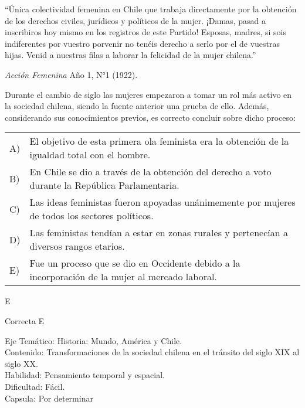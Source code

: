\documentclass[letterpaper,11pt]{article}
\newcommand{\anchopregunta}{0.9\textwidth}
\begin{document}
\begin{enumerate}
\begin{minipage}{\anchopregunta}
\item ``Única colectividad femenina en Chile que trabaja directamente por la obtención de los derechos civiles, jurídicos y políticos de la mujer. ¡Damas, pasad a inscribiros hoy mismo en los registros de este Partido! Esposas, madres, si sois indiferentes por vuestro porvenir no tenéis derecho a serlo por el de vuestras hijas. Venid a nuestras filas a laborar la felicidad de la mujer chilena.''
\begin{flushright}
\textit{Acción Femenina} Año 1, N°1 (1922).
\end{flushright}
Durante el cambio de siglo las mujeres empezaron a tomar un rol más activo en la sociedad chilena, siendo la fuente anterior una prueba de ello. Además, considerando sus conocimientos previos, es correcto concluir sobre dicho proceso:
\begin{flushleft}\begin{tabular}{@{\hspace{-.001\textwidth}}l@{\hspace{2pt}}p{}}
A)& El objetivo de esta primera ola feminista era la obtención de la igualdad total con el hombre.\\
B)& En Chile se dio a través de la obtención del derecho a voto durante la República Parlamentaria.\\
C)& Las ideas feministas fueron apoyadas unánimemente por mujeres de todos los sectores políticos.\\
D)& Las feministas tendían a estar en zonas rurales y pertenecían a diversos rangos etarios.\\
E)& Fue un proceso que se dio en Occidente debido a la incorporación de la mujer al mercado laboral.\\ 
\end{tabular}\end{flushleft}%
\begin{key} E
\end{key} 
\begin{hint}
\end{hint}
\begin{answer} Correcta E \\
\end{answer}
\begin{info} %
\begin{flushleft}
Eje Temático: Historia: Mundo, América y Chile.\\
Contenido: Transformaciones de la sociedad chilena en el tránsito del siglo XIX al siglo XX. \\
Habilidad: Pensamiento temporal y espacial.\\
Dificultad: Fácil.\\
Capsula: Por determinar \\
\end{flushleft} 
\end{info}
\end{minipage}\vfill$\;$ %



\end{enumerate}
\end{document}

